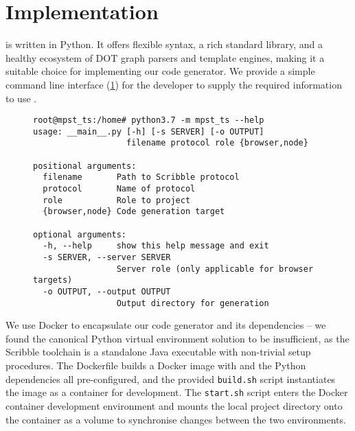 \section{Implementation}

 is written in Python. 
It offers flexible syntax, a rich standard library, and 
a healthy ecosystem of DOT graph parsers and template engines,
making it a suitable choice for implementing our code generator.
We provide a simple command line interface (\cref{lst:cmdline})
for the developer to supply the required information 
to use .

\begin{figure}[!ht]
\begin{lstlisting}
root@mpst_ts:/home# python3.7 -m mpst_ts --help
usage: __main__.py [-h] [-s SERVER] [-o OUTPUT]
                   filename protocol role {browser,node}

positional arguments:
  filename       Path to Scribble protocol
  protocol       Name of protocol
  role           Role to project
  {browser,node} Code generation target

optional arguments:
  -h, --help     show this help message and exit
  -s SERVER, --server SERVER
                 Server role (only applicable for browser targets)
  -o OUTPUT, --output OUTPUT
                 Output directory for generation
\end{lstlisting}
\label{lst:cmdline}
\end{figure}


We use Docker \cite{docker} to encapsulate our code generator
and its dependencies -- we found the canonical Python virtual environment
solution to be insufficient, as the Scribble toolchain is
a standalone Java executable with non-trivial setup procedures.
The Dockerfile builds a Docker image with  and
the Python dependencies all pre-configured, and the provided
\texttt{build.sh} script instantiates the image as a container 
for development.
The \texttt{start.sh} script enters the Docker container
development environment and mounts the local project directory
onto the container as a volume to synchronise changes between the
two environments.